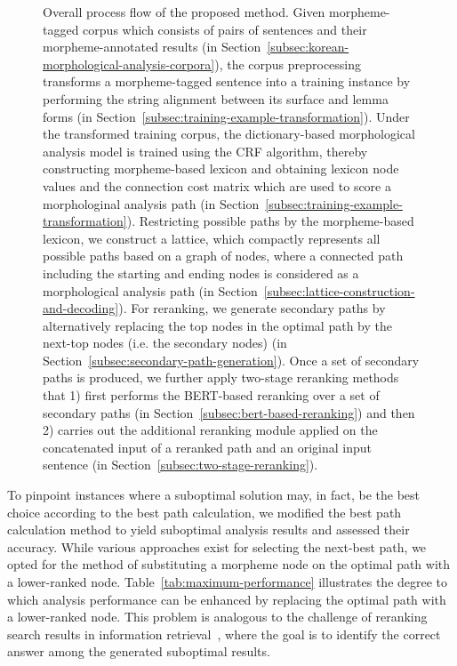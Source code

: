 \documentclass[AMS,STIX2COL]{WileyNJD-v2}
\begin{document}
\begin{figure}[ht]
        \caption{Overall process flow of the proposed method. Given morpheme-tagged corpus which consists of pairs of sentences and their morpheme-annotated results (in Section~\ref{subsec:korean-morphological-analysis-corpora}), the corpus preprocessing transforms a morpheme-tagged sentence into a training instance by performing the string alignment between its surface and lemma forms (in Section~\ref{subsec:training-example-transformation}). Under the transformed training corpus, the dictionary-based morphological analysis model is trained using the CRF algorithm, thereby constructing morpheme-based lexicon and obtaining lexicon node values and the connection cost matrix which are used to score a morphologinal analysis path (in Section~\ref{subsec:training-example-transformation}). Restricting possible paths by the morpheme-based lexicon, we construct a lattice, which compactly represents all possible paths based on a graph of nodes, where a connected path including the starting and ending nodes is considered as a morphological analysis path (in Section~\ref{subsec:lattice-construction-and-decoding}). For reranking, we generate secondary paths by alternatively replacing the top nodes in the optimal path by the next-top nodes (i.e. the secondary nodes) (in Section~\ref{subsec:secondary-path-generation}). Once a set of secondary paths is produced, we further apply two-stage reranking methods that 1) first performs the BERT-based reranking over a set of secondary paths (in Section~\ref{subsec:bert-based-reranking}) and then 2) carries out the additional reranking module applied on the concatenated input of a reranked path and an original input sentence (in Section~\ref{subsec:two-stage-reranking}).}
        \label{fig:block}
    \end{figure}

    To pinpoint instances where a suboptimal solution may, in fact, be the best choice according to the best path calculation, we modified the best path calculation method to yield suboptimal analysis results and assessed their accuracy.
    While various approaches exist for selecting the next-best path, we opted for the method of substituting a morpheme node on the optimal path with a lower-ranked node.
    Table~\ref{tab:maximum-performance} illustrates the degree to which analysis performance can be enhanced by replacing the optimal path with a lower-ranked node.
    This problem is analogous to the challenge of reranking search results in information retrieval~\cite{BaeYJ2021}, where the goal is to identify the correct answer among the generated suboptimal results.
\end{document}
